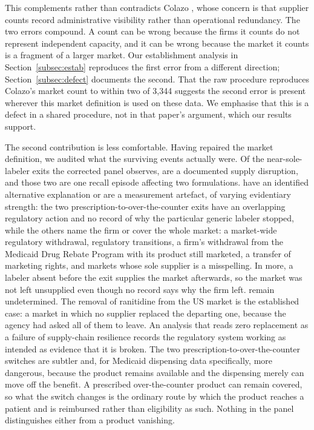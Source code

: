 \documentclass[pdflatex,sn-vancouver-num,Numbered]{sn-jnl}
\begin{document}
This complements rather than contradicts Colazo \cite{colazo2026}, whose concern is that
supplier counts record administrative visibility rather than operational redundancy. The two
errors compound. A count can be wrong because the firms it counts do not represent independent
capacity, and it can be wrong because the market it counts is a fragment of a larger market. Our
establishment analysis in Section~\ref{subsec:estab} reproduces the first error from a different
direction; Section~\ref{subsec:defect} documents the second. That the raw procedure reproduces
Colazo's market count to within two of 3{,}344 suggests the second error is present wherever this
market definition is used on these data. We emphasise that this is a defect in a shared
procedure, not in that paper's argument, which our results support.

The second contribution is less comfortable. Having repaired the market definition, we audited
what the surviving events actually were. Of the \nCauseTotal near-sole-labeler exits the
corrected panel observes, \nCauseSupplyW are a documented supply disruption, and those two are
one recall episode affecting two formulations. \nCauseExplainedUC have an identified alternative explanation or are a measurement artefact,
of varying evidentiary strength: the two prescription-to-over-the-counter exits have an
overlapping regulatory action and no record of why the particular generic labeler stopped, while
the others name the firm or cover the whole market: a market-wide regulatory withdrawal, \nCauseTransitionW
regulatory transitions, a firm's withdrawal from the Medicaid Drug Rebate Program with its
product still marketed, a transfer of marketing rights, and \nCauseArtefactW markets whose sole
supplier is a misspelling. In \nCauseContinuedW more, a labeler absent before the exit supplies
the market afterwards, so the market was not left unsupplied even though no record says why the
firm left. \nCauseUndeterminedUC remain undetermined. The removal of ranitidine from the US
market is the established case: a market in which no supplier replaced the departing one,
because the agency had asked all of them to leave. An analysis that reads zero replacement as a failure of supply-chain resilience records
the regulatory system working as intended as evidence that it is broken. The two
prescription-to-over-the-counter switches are subtler and, for Medicaid dispensing data
specifically, more dangerous, because the product remains available and the dispensing merely
can move off the benefit. A prescribed over-the-counter product can remain covered, so what
the switch changes is the ordinary route by which the product reaches a patient and is
reimbursed rather than eligibility as such. Nothing in the panel distinguishes either from a
product vanishing.
\end{document}
